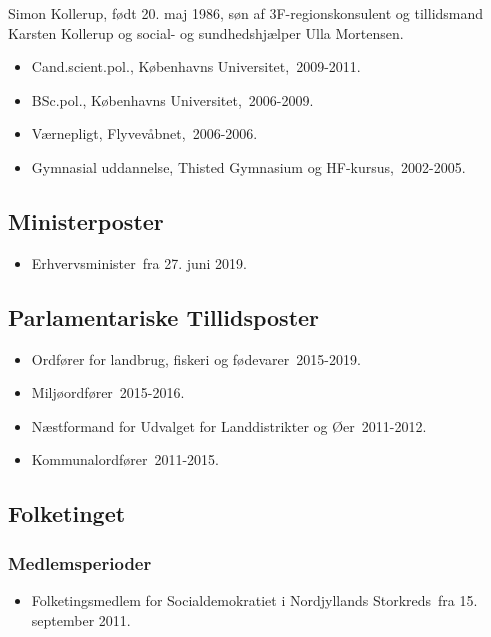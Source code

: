 \documentclass[11pt, a4paper]{awesome-cv}
\begin{document}
\makecvheader[R]
\makelettertitle
\begin{cvletter}
Simon Kollerup, født 20. maj 1986, søn af 3F-regionskonsulent og tillidsmand Karsten Kollerup og social- og sundhedshjælper Ulla Mortensen.

\begin{itemize}
\item Cand.scient.pol., Københavns Universitet, 2009-2011.
\item BSc.pol., Københavns Universitet, 2006-2009.
\item Værnepligt, Flyvevåbnet, 2006-2006.
\item Gymnasial uddannelse, Thisted Gymnasium og HF-kursus, 2002-2005.
\end{itemize}
\subsection*{Ministerposter}
\begin{itemize}
\item Erhvervsminister fra 27. juni 2019.
\end{itemize}
\subsection*{Parlamentariske Tillidsposter}
\begin{itemize}
\item Ordfører for landbrug, fiskeri og fødevarer 2015-2019.
\item Miljøordfører 2015-2016.
\item Næstformand for Udvalget for Landdistrikter og Øer 2011-2012.
\item Kommunalordfører 2011-2015.
\end{itemize}
\subsection*{Folketinget}
\subsubsection*{Medlemsperioder}
\begin{itemize}
\item Folketingsmedlem for Socialdemokratiet i Nordjyllands Storkreds fra 15. september 2011.
\end{itemize}

\end{cvletter}
\end{document}
